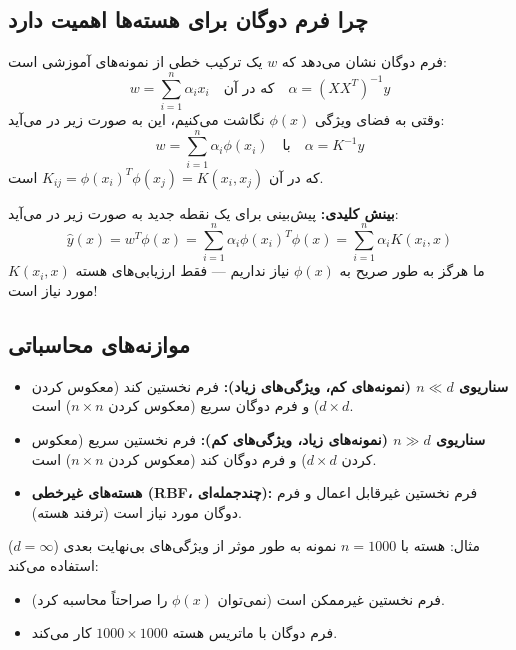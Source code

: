 \documentclass{article}
\begin{document}
\subsection*{چرا فرم دوگان برای هسته‌ها اهمیت دارد}
فرم دوگان نشان می‌دهد که $w$ یک ترکیب خطی از نمونه‌های آموزشی است:
\[
w = \sum_{i=1}^{n} \alpha_i x_i \quad \text{که در آن} \quad \alpha = (X X^T)^{-1} y
\]
وقتی به فضای ویژگی $\phi(x)$ نگاشت می‌کنیم، این به صورت زیر در می‌آید:
\[
w = \sum_{i=1}^{n} \alpha_i \phi(x_i) \quad \text{با} \quad \alpha = K^{-1} y
\]
که در آن $K_{ij} = \phi(x_i)^T \phi(x_j) = K(x_i, x_j)$ است.

\textbf{بینش کلیدی:} پیش‌بینی برای یک نقطه جدید به صورت زیر در می‌آید:
\[
\hat{y}(x) = w^T \phi(x) = \sum_{i=1}^{n} \alpha_i \phi(x_i)^T \phi(x) = \sum_{i=1}^{n} \alpha_i K(x_i, x)
\]
ما هرگز به طور صریح به $\phi(x)$ نیاز نداریم — فقط ارزیابی‌های هسته $K(x_i, x)$ مورد نیاز است!

\subsection*{موازنه‌های محاسباتی}
\begin{itemize}
    \item \textbf{سناریوی $n \ll d$ (نمونه‌های کم، ویژگی‌های زیاد):} فرم نخستین کند (معکوس کردن $d \times d$) و فرم دوگان سریع (معکوس کردن $n \times n$) است.
    \item \textbf{سناریوی $n \gg d$ (نمونه‌های زیاد، ویژگی‌های کم):} فرم نخستین سریع (معکوس کردن $d \times d$) و فرم دوگان کند (معکوس کردن $n \times n$) است.
    \item \textbf{هسته‌های غیرخطی (RBF، چندجمله‌ای):} فرم نخستین غیرقابل اعمال و فرم دوگان مورد نیاز است (ترفند هسته).
\end{itemize}

مثال: هسته  با $n=1000$ نمونه به طور موثر از ویژگی‌های بی‌نهایت بعدی ($d=\infty$) استفاده می‌کند:
\begin{itemize}
    \item فرم نخستین غیرممکن است (نمی‌توان $\phi(x)$ را صراحتاً محاسبه کرد).
    \item فرم دوگان با ماتریس هسته $1000 \times 1000$ کار می‌کند.
\end{itemize}
\end{document}
